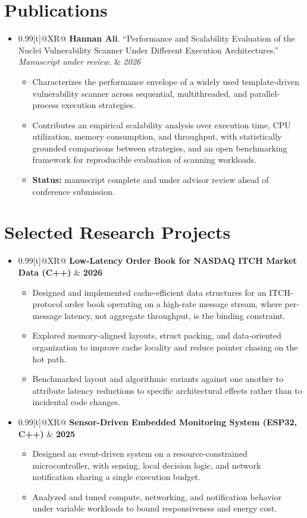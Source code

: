 \documentclass[letterpaper,10pt]{article}
\makeatletter
\newcommand{\cvitemsingle}[2]{%
	\Needspace*{5\baselineskip}\vspace{1pt}\item[]
	\begin{tabularx}{0.99\textwidth}[t]{@{}XR@{}}
		\textbf{#1} & \textbf{\small #2} \\
	\end{tabularx}\vspace{-5pt}
}
\newcommand{\cvpub}[2]{%
	\vspace{2pt}\item[]
	\begin{tabularx}{0.99\textwidth}[t]{@{}XR@{}}
		#1 & {\small \textit{#2}} \\
	\end{tabularx}\vspace{-4pt}
}
\newcommand{\cvbullet}[1]{\item\small{#1 \vspace{-2pt}}}
\newcommand{\cvlist}{\begin{itemize}[leftmargin=0.16in,label=$\bullet$,topsep=2pt,itemsep=1pt,parsep=0pt]}
\newcommand{\cvlistend}{\end{itemize}\vspace{-4pt}}
\newcommand{\cvsectionlist}{\begin{itemize}[leftmargin=0in,label={}]}
\newcommand{\cvsectionlistend}{\end{itemize}}
\makeatother
\begin{document}
	\section{Publications}
	\cvsectionlist
	\cvpub{\small \textbf{Hannan Ali}. ``Performance and Scalability Evaluation of the Nuclei Vulnerability Scanner Under Different Execution Architectures.'' \textit{Manuscript under review.}}{2026}
	\cvlist
	\cvbullet{Characterizes the performance envelope of a widely used template-driven vulnerability scanner across sequential, multithreaded, and parallel-process execution strategies.}
	\cvbullet{Contributes an empirical scalability analysis over execution time, CPU utilization, memory consumption, and throughput, with statistically grounded comparisons between strategies, and an open benchmarking framework for reproducible evaluation of scanning workloads.}
	\cvbullet{\textbf{Status:} manuscript complete and under advisor review ahead of conference submission.}
	\cvlistend
	\cvsectionlistend
	
	\section{Selected Research Projects}
	\cvsectionlist
	
	\cvitemsingle{Low-Latency Order Book for NASDAQ ITCH Market Data \small{(C++)}}{2026}
	\cvlist
	\cvbullet{Designed and implemented cache-efficient data structures for an ITCH-protocol order book operating on a high-rate message stream, where per-message latency, not aggregate throughput, is the binding constraint.}
	\cvbullet{Explored memory-aligned layouts, struct packing, and data-oriented organization to improve cache locality and reduce pointer chasing on the hot path.}
	\cvbullet{Benchmarked layout and algorithmic variants against one another to attribute latency reductions to specific architectural effects rather than to incidental code changes.}
	\cvlistend
	
	\cvitemsingle{Sensor-Driven Embedded Monitoring System \small{(ESP32, C++)}}{2025}
	\cvlist
	\cvbullet{Designed an event-driven system on a resource-constrained microcontroller, with sensing, local decision logic, and network notification sharing a single execution budget.}
	\cvbullet{Analyzed and tuned compute, networking, and notification behavior under variable workloads to bound responsiveness and energy cost.}
	\cvlistend
	
	\cvsectionlistend
	
\end{document}
